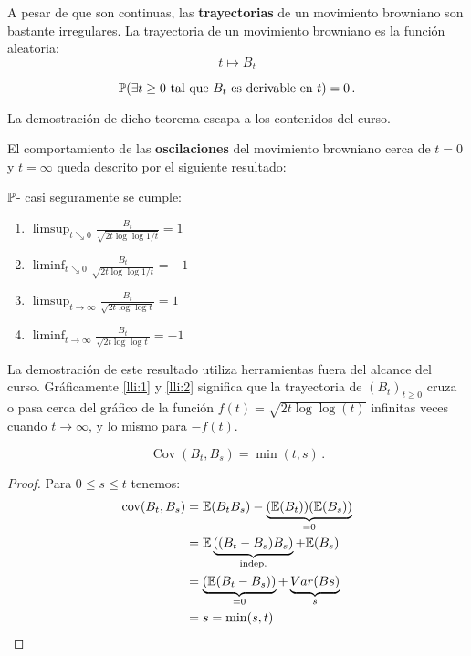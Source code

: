 A pesar de que son continuas, las \textbf{trayectorias} de un movimiento browniano son bastante irregulares. La trayectoria de un movimiento browniano es la función aleatoria:
\begin{equation*}
     t \mapsto B_t
\end{equation*}

\begin{theorem}
$$\P( \exists t \geq 0 \text{ tal que } B_t \text{ es derivable en } t) = 0 \,.$$
\end{theorem}

La demostración de dicho teorema escapa a los contenidos del curso. 

\newp El comportamiento de las \textbf{oscilaciones} del movimiento browniano cerca de $t=0$ y $t=\infty$ queda descrito por el siguiente resultado:

\begin{theorem}
$\P$- casi seguramente se cumple:
\begin{enumerate}
     \item \label{lli:1} $\limsup_{t \searrow 0} \frac{B_t}{\sqrt{ 2t \log \log {1/t}}} = 1$
     \item \label{lli:2} $\liminf_{t \searrow 0} \frac{B_t}{\sqrt{ 2t \log \log {1/t}}} = -1$
     \item \label{lli:3} $\limsup_{t \rightarrow \infty} \frac{B_t}{\sqrt{ 2t \log \log {t}}} = 1$
     \item \label{lli:4} $\liminf_{t \rightarrow \infty} \frac{B_t}{\sqrt{ 2t \log \log {t}}} = -1$
\end{enumerate}
\end{theorem}

\newp La demostración de este resultado utiliza herramientas fuera del alcance del curso. Gráficamente  \ref{lli:1} y \ref{lli:2} significa que la trayectoria de $(B_{t})_{t \geq 0}$ cruza o pasa cerca del gráfico de la función $f(t) = \sqrt{2t \log \log (t)} $ infinitas veces cuando $t \rightarrow \infty$, y lo mismo para $-f(t)$. 

\begin{proposition}
     $$ \operatorname{Cov}(B_t,B_s) = \min(t,s) \,.$$
\end{proposition}
\begin{proof}
\gris
 Para $0 \leq s \leq t$ tenemos: 
\begin{align*}
     \operatorname{cov}(B_t, B_s)
     &= \E (B_t B_s) - \underbrace{(\E (B_t))(\E (B_s))}_{= 0} \\
     &= \E \underbrace{((B_t - B_s)B_s)}_{\text{indep.}} + \E(B_s) \\
     &= \underbrace{\left( \E(B_t - B_s) \right)}_{=0} + \underbrace{\var({Bs})}_{s}\\
     &= s = \min(s,t)
\end{align*}
\findem
\negro
\end{proof}

